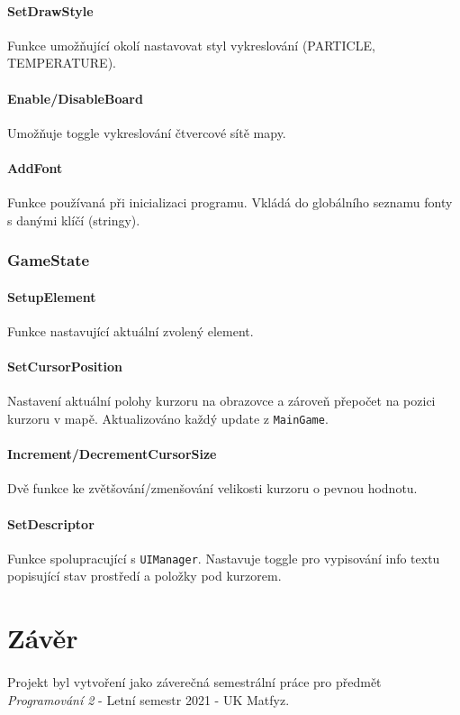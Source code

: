 \documentclass[a4paper, 12pt]{article}
\begin{document}
\paragraph{SetDrawStyle}
Funkce umožňující okolí nastavovat styl vykreslování (PARTICLE, TEMPERATURE).

\paragraph{Enable/DisableBoard}
Umožňuje toggle vykreslování čtvercové sítě mapy.

\paragraph{AddFont}
Funkce používaná při inicializaci programu. Vkládá do globálního seznamu fonty
s danými klíčí (stringy).

\subsubsection{GameState}
\paragraph{SetupElement}
Funkce nastavující aktuální zvolený element.

\paragraph{SetCursorPosition}
Nastavení aktuální polohy kurzoru na obrazovce a zároveň přepočet na pozici
kurzoru v mapě. Aktualizováno každý update z \texttt{MainGame}.

\paragraph{Increment/DecrementCursorSize}
Dvě funkce ke zvětšování/zmenšování velikosti kurzoru o pevnou hodnotu.

\paragraph{SetDescriptor}
Funkce spolupracující s \texttt{UIManager}. Nastavuje toggle pro vypisování
info textu popisující stav prostředí a položky pod kurzorem. 

\section{Závěr}
\paragraph{}
Projekt byl vytvoření jako záverečná semestrální práce pro předmět
\\\emph{Programování 2} - Letní semestr 2021 - UK Matfyz.
\end{document}
